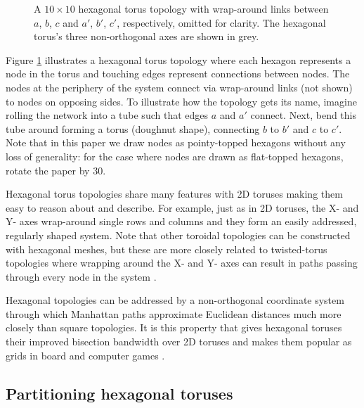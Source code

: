 			\begin{figure}
				\center
				
				\caption{A $10 \times 10$ hexagonal torus topology with wrap-around
				links between $a$, $b$, $c$ and $a'$, $b'$, $c'$, respectively, omitted
				for clarity. The hexagonal torus's three non-orthogonal axes are shown
				in grey.}
				\label{fig:hexagonalTorusTopology}
			\end{figure}
			
			Figure \ref{fig:hexagonalTorusTopology} illustrates a hexagonal torus
			topology where each hexagon represents a node in the torus and touching
			edges represent connections between nodes. The nodes at the periphery of
			the system connect via wrap-around links (not shown) to nodes on opposing
			sides. To illustrate how the topology gets its name, imagine rolling the
			network into a tube such that edges $a$ and $a'$ connect. Next, bend this
			tube around forming a torus (doughnut shape), connecting $b$ to $b'$ and
			$c$ to $c'$. Note that in this paper we draw nodes as pointy-topped
			hexagons without any loss of generality: for the case where nodes are
			drawn as flat-topped hexagons, rotate the paper by 30\degree{}.
			
			Hexagonal torus topologies share many features with 2D toruses making them
			easy to reason about and describe. For example, just as in 2D toruses, the
			X- and Y- axes wrap-around single rows and columns and they form an easily
			addressed, regularly shaped system. Note that other toroidal topologies
			can be constructed with hexagonal meshes, but these are more closely
			related to twisted-torus topologies where wrapping around the X- and Y-
			axes can result in paths passing through every node in the system
			\cite{camara10}.
			
			Hexagonal topologies can be addressed by a non-orthogonal coordinate
			system through which Manhattan paths approximate Euclidean distances much
			more closely than square topologies. It is this property that gives
			hexagonal toruses their improved bisection bandwidth over 2D toruses and
			makes them popular as grids in board and computer games \cite{patel15}.
		
		\subsection{Partitioning hexagonal toruses}
			
			\label{sec:parititioning}
			
